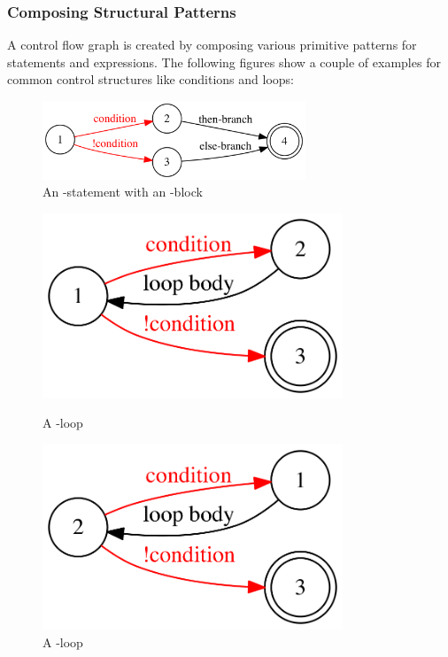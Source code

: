 \subsubsection{Composing Structural Patterns}
\label{sec:composing-structural-patterns}

A control flow graph is created by composing various primitive patterns for statements and expressions. The following figures show a couple of examples for common control structures like conditions and loops:

\begin{figure}[h]
  \centering
  \includegraphics[width=0.7\textwidth]{sections/algorithm/images/if-else}
  \caption{An -statement with an -block}
  \label{fig:if-else-structural-pattern}
\end{figure}

\begin{figure}[h]
\noindent\begin{minipage}[t]{0.50\textwidth}
  \centering
  \includegraphics[width=0.8\textwidth]{sections/algorithm/images/while}
  \caption{A -loop}
\end{minipage}
\begin{minipage}[t]{0.50\textwidth}
  \centering
  \includegraphics[width=0.8\textwidth]{sections/algorithm/images/do-while}
  \caption{A -loop}
\end{minipage}
\end{figure}

